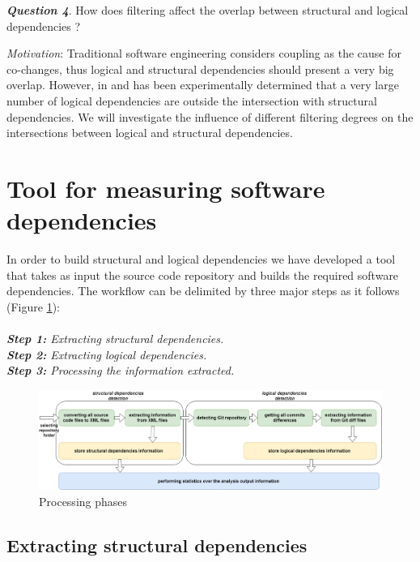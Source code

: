 \documentclass[conference]{IEEEtran}
\begin{document}
\textit{\textbf{Question 4}}. How does filtering affect the overlap between structural and logical dependencies ? 

\textit{Motivation}: Traditional software engineering considers coupling as the cause for co-changes, thus logical and structural dependencies should present a very big overlap. However, in \cite{Oliva:2011:ISL:2067853.2068086} and \cite{DBLP:journals/jss/AjienkaC17} has been experimentally determined that a very large number of logical dependencies are outside the intersection with structural dependencies. We will investigate the influence of different filtering degrees on the intersections between logical and structural dependencies.  





\section{Tool for measuring software dependencies}
\label{sec:tool}

In order to build structural and logical dependencies we have developed a tool that takes as input the source code repository and builds the required software dependencies. The workflow can be delimited by three major steps as it follows (Figure \ref{fig:fig3}):\\ \\
\textit{\textbf{Step 1:} Extracting structural dependencies.}\\
\textit{\textbf{Step 2:} Extracting logical dependencies.}\\
\textit{\textbf{Step 3:} Processing the information extracted.}



\begin{figure}[htb]
\centering
\includegraphics[width=\textwidth]{fig3.png}
\caption{Processing phases}
\label{fig:fig3}
\end{figure}

\subsection{ Extracting structural dependencies}
\end{document}
